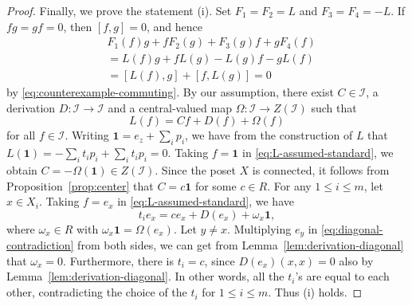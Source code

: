 \documentclass[10pt,a4paper]{amsart}
\newcommand{\I}{\mathcal I}
\newcommand{\one}{\mathbf 1}
\begin{document}
\begin{proof}
Finally, we prove the statement (i).
Set $F_1=F_2=L$ and $F_3=F_4=-L$.
If $fg=gf=0$, then $[f,g]=0$, and hence
\[
\begin{aligned}
&F_1(f)g+fF_2(g)+F_3(g)f+gF_4(f)\\
&=L(f)g+fL(g)-L(g)f-gL(f)\\
&=[L(f),g]+[f,L(g)]=0
\end{aligned}
\]
by \eqref{eq:counterexample-commuting}. By our assumption, there exist $C\in\I$,
a derivation $D:\I\to \I$ and a central-valued map $\Omega: \I\to Z(\I)$ such that
\begin{equation}\label{eq:L-assumed-standard}
L(f)=Cf+D(f)+\Omega(f)
\end{equation}
for all $f\in\I$. Writing $\one=e_z+\sum_i p_i$, we have from the construction of $L$ that
$L(\one)=-\sum_i t_ip_i+\sum_i t_ip_i=0$. Taking $f=\one$ in \eqref{eq:L-assumed-standard},
we obtain $C=-\Omega(\one)\in Z(\I)$. Since the poset $X$ is connected, it follows from
Proposition~\ref{prop:center} that $C=c\one$ for some $c\in R$.
For any $1\leq i\leq m$, let $x\in X_i$. Taking $f=e_x$ in \eqref{eq:L-assumed-standard}, we have
\begin{equation}\label{eq:diagonal-contradiction}
t_i e_x=ce_x+D(e_x)+\omega_x\one,
\end{equation}
where $\omega_x\in R$ with $\omega_x\one=\Omega(e_x)$. Let $y\neq x$.
Multiplying $e_y$ in \eqref{eq:diagonal-contradiction} from both sides, we can get from Lemma~\ref{lem:derivation-diagonal}
that $\omega_x=0$. Furthermore, there is $t_i=c$, since $D(e_x)(x,x)=0$ also by Lemma~\ref{lem:derivation-diagonal}.
In other words, all the $t_i$'s are equal to each other, contradicting the
choice of the $t_i$ for $1\leq i\leq m$. Thus (i) holds.
\end{proof}
\end{document}
